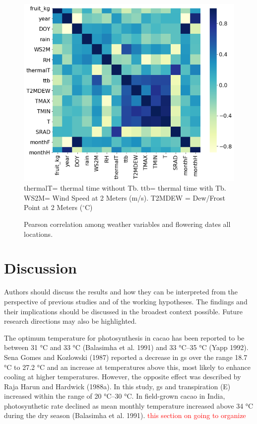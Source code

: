 \documentclass[gene,journal,article,submit,moreauthors,pdftex]{Definitions/mdpi}
\begin{document}
\begin{figure}[h!]
	\centering
	\caption{\footnotesize {Pearson correlation among weather variables and flowering dates all locations. \\}} 
	\includegraphics[scale=0.5]{images/heatm.png}\\
	\label{fig:heat}
	{\footnotesize thermalT= thermal time without Tb. ttb= thermal time with Tb. WS2M= Wind Speed at 2 Meters (m/s). T2MDEW = Dew/Frost Point at 2 Meters ($^\circ$C) }
\end{figure}
\newpage


\section{Discussion}
Authors should discuss the results and how they can be interpreted from the perspective of previous studies and of the working hypotheses. The findings and their implications should be discussed in the broadest context possible. Future research directions may also be highlighted.


The optimum temperature for photosynthesis in cacao has
been reported to be between 31 °C and 33 °C (Balasimha et al.
1991) and 33 °C–35 °C (Yapp 1992). Sena Gomes and
Kozlowski (1987) reported a decrease in gs over the range
18.7 °C to 27.2 °C and an increase at temperatures above this,
most likely to enhance cooling at higher temperatures.
However, the opposite effect was described by Raja Harun
and Hardwick (1988a). In this study, gs and transpiration (E)
increased within the range of 20 °C–30 °C. In field-grown
cacao in India, photosynthetic rate declined as mean monthly
temperature increased above 34 °C during the dry season
(Balasimha et al. 1991). \cite{lahive2019}
\textcolor{red}{this section on going to organize}
\end{document}
